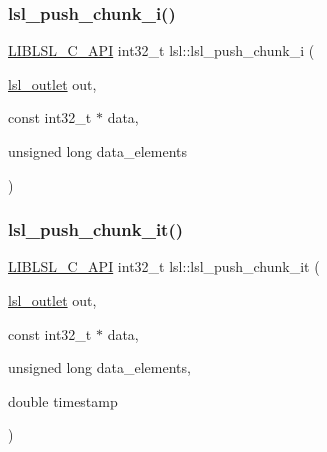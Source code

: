 \subsubsection{\texorpdfstring{lsl\+\_\+push\+\_\+chunk\+\_\+i()}{lsl\_push\_chunk\_i()}}
{\footnotesize\ttfamily \hyperlink{lsl__cpp_8h_aafd0ef1813e8be84a1420c4f1df64615}{L\+I\+B\+L\+S\+L\+\_\+\+C\+\_\+\+A\+PI} int32\+\_\+t lsl\+::lsl\+\_\+push\+\_\+chunk\+\_\+i (\begin{DoxyParamCaption}\item[{\hyperlink{namespacelsl_abcf512b0f66dacf86c10b165995fd50b}{lsl\+\_\+outlet}}]{out,  }\item[{const int32\+\_\+t $\ast$}]{data,  }\item[{unsigned long}]{data\+\_\+elements }\end{DoxyParamCaption})}

\mbox{\label{namespacelsl_aede257c8d3911fbc26329bd4af8bcc9a}} 
\subsubsection{\texorpdfstring{lsl\+\_\+push\+\_\+chunk\+\_\+it()}{lsl\_push\_chunk\_it()}}
{\footnotesize\ttfamily \hyperlink{lsl__cpp_8h_aafd0ef1813e8be84a1420c4f1df64615}{L\+I\+B\+L\+S\+L\+\_\+\+C\+\_\+\+A\+PI} int32\+\_\+t lsl\+::lsl\+\_\+push\+\_\+chunk\+\_\+it (\begin{DoxyParamCaption}\item[{\hyperlink{namespacelsl_abcf512b0f66dacf86c10b165995fd50b}{lsl\+\_\+outlet}}]{out,  }\item[{const int32\+\_\+t $\ast$}]{data,  }\item[{unsigned long}]{data\+\_\+elements,  }\item[{double}]{timestamp }\end{DoxyParamCaption})}

\mbox{\label{namespacelsl_a0ea52f33684ceab15ad7244636291ddd}} 
